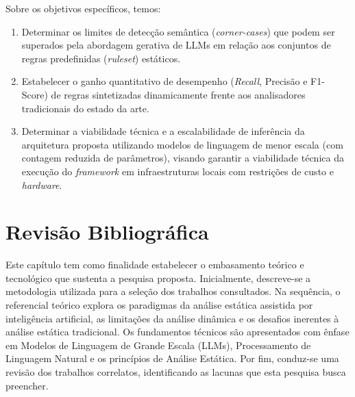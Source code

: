 \documentclass[
    12pt,                %
    openright,           %
    oneside,             %
    a4paper,             %
    english,             %
    brazil               %
]{abntex2}
\begin{document}
\begin{itemize}
\par
Sobre os objetivos específicos, temos:

\begin{enumerate}
  \item Determinar os limites de detecção semântica (\textit{corner-cases}) que podem ser superados pela abordagem gerativa de LLMs em relação aos conjuntos de regras predefinidas (\textit{ruleset}) estáticos.
  \item Estabelecer o ganho quantitativo de desempenho (\textit{Recall}, Precisão e F1-Score) de regras sintetizadas dinamicamente frente aos analisadores tradicionais do estado da arte.
  \item Determinar a viabilidade técnica e a escalabilidade de inferência da arquitetura proposta utilizando modelos de linguagem de menor escala (com contagem reduzida de parâmetros), visando garantir a viabilidade técnica da execução do \textit{framework} em infraestruturas locais com restrições de custo e \textit{hardware}.
\end{enumerate}

\chapter{Revisão Bibliográfica}
\label{cap:revisao}
\par
Este capítulo tem como finalidade estabelecer o embasamento teórico e tecnológico que sustenta a pesquisa proposta.
Inicialmente, descreve-se a metodologia utilizada para a seleção dos trabalhos consultados. Na sequência, o referencial teórico explora os paradigmas da análise estática assistida por inteligência artificial, as limitações da análise dinâmica e os desafios inerentes à análise estática tradicional. 
Os fundamentos técnicos são apresentados com ênfase em Modelos de Linguagem de Grande Escala (LLMs), Processamento de Linguagem Natural e os princípios de Análise Estática. 
Por fim, conduz-se uma revisão dos trabalhos correlatos, identificando as lacunas que esta pesquisa busca preencher.


\end{itemize}
\end{document}
